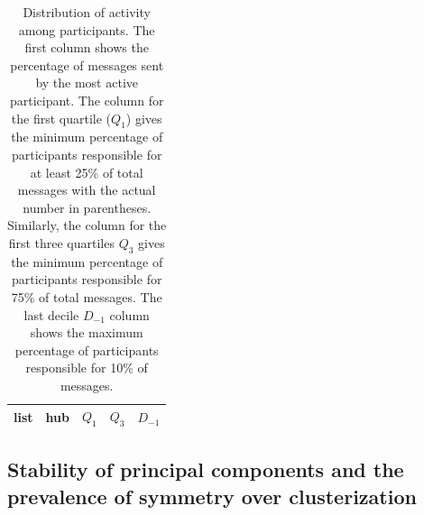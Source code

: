 \documentclass[%
	aip,
	jmp,%
	amsmath,amssymb,
	reprint,%
]{revtex4-1}
\begin{document}
																																																																																		\begin{table}[h]
																																																																																			\caption{Distribution of activity among participants.
																																																																																				The first column shows the percentage of messages sent by the most active participant. The column for the first quartile ($Q_1$) gives the minimum percentage of participants responsible for at least 25\% of total messages with the actual number in parentheses. Similarly, the column for the first three quartiles $Q_3$ gives the minimum percentage of participants responsible for 75\% of total messages.
																																																																																				The last decile $D_{-1}$ column shows the maximum percentage of participants responsible for 10\% of messages.}
																																																																																				\begin{center}
																																																																																					\begin{tabular}{ | l ||  c | c | c | c | }
																																																																																						\hline
																																																																																						list & hub & $ Q_1 $ & $ Q_3 $ & $D_{-1}$ \\ \hline
																																																																																						
																																																																																					\end{tabular}
																																																																																				\end{center}
																																																																																				\label{autores}
																																																																																			\end{table}


																																																																																			\subsection{Stability of principal components and the prevalence of symmetry over clusterization}\label{prevalence}
\end{document}
